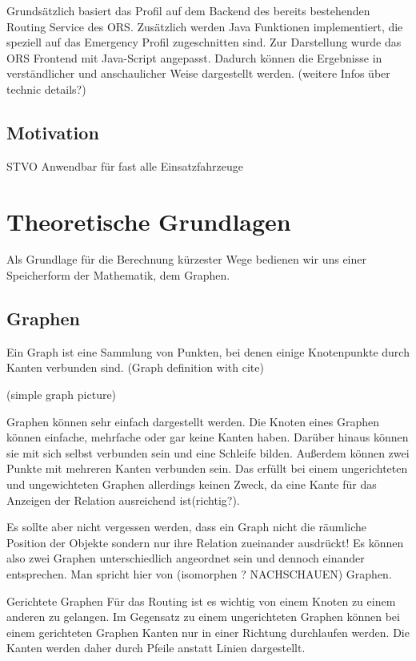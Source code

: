 \documentclass[10pt,a4paper]{article}
\begin{document}
Grundsätzlich basiert das Profil auf dem Backend des bereits bestehenden Routing Service des ORS. Zusätzlich werden Java Funktionen implementiert, die speziell auf das Emergency Profil zugeschnitten sind. Zur Darstellung wurde das ORS Frontend mit Java-Script angepasst. Dadurch können die Ergebnisse in verständlicher und anschaulicher Weise dargestellt werden.
(weitere Infos über technic details?)

\subsection{Motivation}

STVO
Anwendbar für fast alle Einsatzfahrzeuge 

\section{Theoretische Grundlagen}

Als Grundlage für die Berechnung kürzester Wege bedienen wir uns einer Speicherform der Mathematik, dem Graphen.

\subsection{Graphen}

Ein Graph ist eine Sammlung von Punkten, bei denen einige Knotenpunkte durch Kanten verbunden sind. 
(Graph definition with cite)

(simple graph picture)

Graphen können sehr einfach dargestellt werden. Die Knoten eines Graphen können einfache, mehrfache oder gar keine Kanten haben. Darüber hinaus können sie mit sich selbst verbunden sein und eine Schleife bilden. Außerdem können zwei Punkte mit mehreren Kanten verbunden sein. Das erfüllt bei einem ungerichteten und ungewichteten Graphen allerdings keinen Zweck, da eine Kante für das Anzeigen der Relation ausreichend ist(richtig?).

Es sollte aber nicht vergessen werden, dass ein Graph nicht die räumliche Position der Objekte sondern nur ihre Relation zueinander ausdrückt! Es können also zwei Graphen unterschiedlich angeordnet sein und dennoch einander entsprechen. Man spricht hier von (isomorphen ? NACHSCHAUEN) Graphen.

Gerichtete Graphen
Für das Routing ist es wichtig von einem Knoten zu einem anderen zu gelangen. Im Gegensatz zu einem ungerichteten Graphen können bei einem gerichteten Graphen Kanten nur in einer Richtung durchlaufen werden. Die Kanten werden daher durch Pfeile anstatt Linien dargestellt. 
\end{document}
